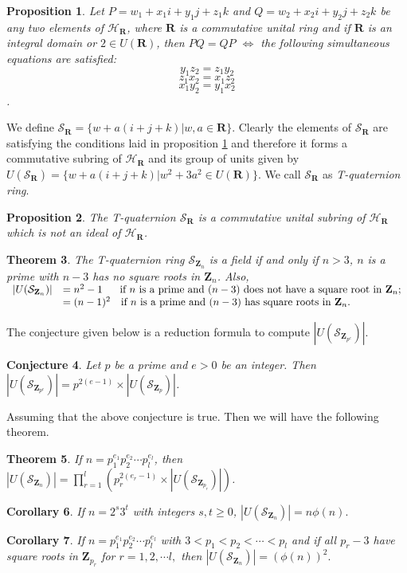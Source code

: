 \documentclass[sn-mathphys,Numbered]{sn-jnl}%
\theoremstyle{thmstyleone}
\newtheorem{theorem}{Theorem}
\newtheorem{proposition}[theorem]{Proposition}
\theoremstyle{thmstyletwo}
\newtheorem{corollary}[theorem]{Corollary}
\theoremstyle{thmstylethree}
\newtheorem{conjecture}[theorem]{Conjecture}
\begin{document}
\begin{proposition} \label{rd21}
Let $P=w_{1}+x_{1}i+y_{1}j+z_{1}k$ and $Q=w_{2}+x_{2}i+y_{2}j+z_{2}k$ be any two elements of $\mathcal{H}_{\mathbf{R}}$, where $\mathbf{R}$ is a commutative unital ring and if $\mathbf{R }$ is an integral domain or $2 \in U(\mathbf{R})$, then $PQ=QP$ $\iff$ the following simultaneous equations are satisfied:\\ $$y_{1}z_{2}=z_{1}y_{2}$$ $$z_{1}x_{2}=x_{1}z_{2}$$ $$x_{1}y_{2}=y_{1}x_{2}$$. 
\end{proposition}
\noindent
We define $\mathcal{S}_{\mathbf{R}}=\{ w+a(i+j+k) | w,a \in \mathbf{R}\}$. Clearly the elements of $\mathcal{S}_{\mathbf{R}}$ are satisfying the conditions laid in proposition \ref{rd21} and therefore it forms a commutative subring of $\mathcal{H}_{\mathbf{R}}$ and its group of units given by $U(\mathcal{S}_{\mathbf{R}})=\{ w+a(i+j+k) | w^{2}+3a^{2} \in U(\mathbf{R})\}$. We call $\mathcal{S}_{\mathbf{R}}$ as \textit{T-quaternion ring}. 
\begin{proposition}
The T-quaternion $\mathcal{S}_{\mathbf{R}}$ is a commutative unital subring of $\mathcal{H}_{\mathbf{R}}$ which is not an ideal of $\mathcal{H}_{\mathbf{R}}$.
\end{proposition}
\begin{theorem} \label{rd22}
The T-quaternion ring $\mathcal{S}_{\mathbf{Z}_{n}}$ is a field if and only if $n>3$, $n$ is a prime with $n-3$ has no square roots in $\mathbf{Z}_{n}$. Also, \\
 $ \begin{array}{ll}
    |U(\mathcal{S}_{\mathbf{Z}_{n}})| &= n^{2}-1 \quad \ \ \hbox{if $n$ is a prime and $(n-3)$ does not have  a square root in $\mathbf{Z}_{n}$;}  \\
          & =(n-1)^{2} \quad \hbox{if $n$ is a prime and $(n-3$) has  square roots in $\mathbf{Z}_{n}$.}  
   \end{array}$
\end{theorem}
\noindent
The conjecture given below is a reduction formula to compute $|U(\mathcal{S}_{\mathbf{Z}_{p^{e}}})|$. 
\begin{conjecture} \label{rd23}
Let $p$ be a prime and $e>0$ be an integer. Then $|U(\mathcal{S}_{\mathbf{Z}_{p^{e}}})|=p^{2(e-1)} \times |U(\mathcal{S}_{\mathbf{Z}_{p}})|$.
\end{conjecture}
\noindent
Assuming that the above conjecture is true. Then we will have the following theorem. 
\begin{theorem} \label{rd24}
If $n=p_{1}^{e_{1}}p_{2}^{e_{2}} \cdots p_{l}^{e_{l}}$, then $|U(\mathcal{S}_{\mathbf{Z}_{n}})|=\prod_{r=1}^{l} (p_{r}^{2(e_{r}-1)} \times |U(\mathcal{S}_{\mathbf{Z}_{p_{r}}})|)$.
\end{theorem}
\begin{corollary}
If $n=2^{s}3^{t}$ with integers $s,t \geq 0$, $|U(\mathcal{S}_{\mathbf{Z}_{n}})| =n\phi(n).$
\end{corollary}
\begin{corollary}
If $n=p_{1}^{e_{1}}p_{2}^{e_{2}} \cdots p_{l}^{e_{l}}$ with $3<p_{1}<p_{2}< \cdots <p_{l}$ and if all $p_{r}-3$ have square roots in $\mathbf{Z}_{p_{r}}$ for $r=1,2, \cdots l, $ then $|U(\mathcal{S}_{\mathbf{Z}_{n}})|=(\phi(n))^{2}.$
\end{corollary}
\end{document}
